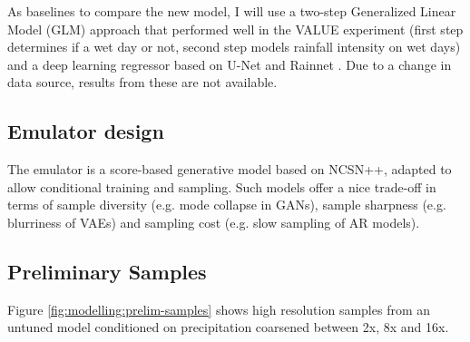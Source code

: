 As baselines to compare the new model, I will use a two-step Generalized Linear Model (GLM) approach that performed well in the VALUE experiment \cite{gutierrez2019sdcomparison} (first step determines if a wet day or not, second step models rainfall intensity on wet days) and a deep learning regressor based on U-Net and Rainnet \cite{ayzel2020rainnet,ravuri2021deepgenprecip}. Due to a change in data source, results from these are not available.

\subsection{Emulator design}

The emulator is a score-based generative model based on NCSN++\cite{song2021sbgmsde}, adapted to allow conditional training and sampling. Such models offer a nice trade-off in terms of sample diversity (e.g. mode collapse in GANs), sample sharpness (e.g. blurriness of VAEs) and sampling cost (e.g. slow sampling of AR models).

\subsection{Preliminary Samples}

Figure \ref{fig:modelling:prelim-samples} shows high resolution samples from an untuned model conditioned on precipitation coarsened between 2x, 8x and 16x.

